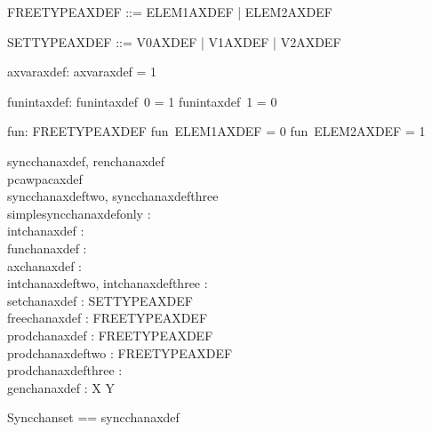 \begin{zed}
   FREETYPEAXDEF ::= ELEM1AXDEF | ELEM2AXDEF
\end{zed}

\begin{zed}
   SETTYPEAXDEF ::= V0AXDEF | V1AXDEF | V2AXDEF
\end{zed}

\begin{axdef}
  axvaraxdef: \nat
\where
  axvaraxdef = 1
\end{axdef}

\begin{axdef}
      funintaxdef: \nat \pfun \nat
    \where
      funintaxdef~0 = 1 \land
      funintaxdef~1 = 0
\end{axdef}

\begin{axdef}
      fun: FREETYPEAXDEF \pfun \nat
    \where
      fun~ELEM1AXDEF = 0 \land
      fun~ELEM2AXDEF = 1
\end{axdef}

\begin{circus}
 \circchannel syncchanaxdef, renchanaxdef \\
 \circchannel pcawpacaxdef \\
 \circchannel syncchanaxdeftwo, syncchanaxdefthree \\
 \circchannel simplesyncchanaxdefonly : \nat \\
 \circchannel intchanaxdef : \nat \\
 \circchannel funchanaxdef : \nat \\
 \circchannel axchanaxdef : \nat \\
 \circchannel intchanaxdeftwo, intchanaxdefthree : \nat \\

 \circchannel setchanaxdef : SETTYPEAXDEF \\
 \circchannel freechanaxdef : FREETYPEAXDEF \\
 \circchannel prodchanaxdef : \nat \cross FREETYPEAXDEF \\
 \circchannel prodchanaxdeftwo : \nat \cross FREETYPEAXDEF \\
 \circchannel prodchanaxdefthree : \nat \cross \nat \cross \nat \\
 \circchannel [X, Y] genchanaxdef : X \cross Y \\
\end{circus}


\begin{circus}
  \circchannelset Syncchanset == \lchanset syncchanaxdef \rchanset \\
\end{circus}

